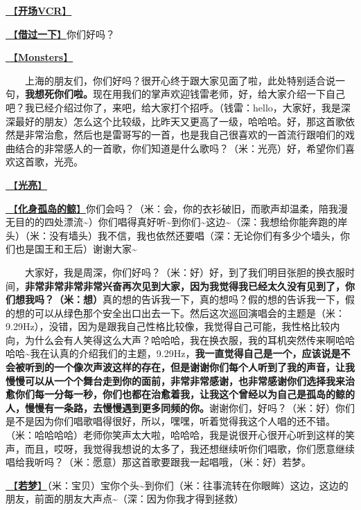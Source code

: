 \documentclass[]{ctexbook}
\begin{document}
\hyperref[opening-vcr]{🎥【\textbf{开场VCR}】}

\hyperref[I-will-go-my-way]{🎵【\textbf{借过一下}】}你们好吗？

\hyperref[Monsters]{🎵【\textbf{Monsters}】}

  上海的朋友们，你们好吗？很开心终于跟大家见面了啦，此处特别适合说一句，\textbf{我想死你们啦。}现在用我们的掌声欢迎钱雷老师，好，给大家介绍一下自己吧？我已经介绍过你了，来吧，给大家打个招呼。（钱雷：hello，大家好，我是深深最好的朋友）怎么这个比较级，比昨天又更高了一级，哈哈哈。好，那这首歌依然是非常治愈，然后也是雷哥写的一首，也是我自己很喜欢的一首流行跟咱们的戏曲结合的非常感人的一首歌，你们知道是什么歌吗？（米：光亮）好，希望你们喜欢这首歌，光亮。

\hyperref[silver-linings]{🎵【\textbf{光亮}】}

\hyperref[hua-shen-gu-dao-de-jing]{🎵【\textbf{化身孤岛的鲸}】}你们会吗？（米：会，你的衣衫破旧，而歌声却温柔，陪我漫无目的的四处漂流\textasciitilde）你们唱得真好听\textasciitilde 到你们\textasciitilde 这边\textasciitilde（深：我想给你能奔跑的岸头）（米：没有墙头）我不信，我也依然还要唱（深：无论你们有多少个墙头，你们也是国王和王后）谢谢大家\textasciitilde{}

  大家好，我是周深，你们好吗？（米：好）好，到了我们明目张胆的换衣服时间，\textbf{非常非常非常非常兴奋再次见到大家，因为我觉得我已经太久没有见到了，你们想我吗？（米：想）}真的想的告诉我一下，真的想吗？假的想的告诉我一下，假的想的可以从绿色那个安全出口出去一下。然后这次巡回演唱会的主题是（米：9.29Hz），没错，因为是跟我自己性格比较像，我觉得自己可能，我性格比较内向，为什么会有人笑得这么大声？哈哈哈，我在换衣服，我的耳机突然传来啊哈哈哈哈\textasciitilde 我在认真的介绍我们的主题，9.29Hz，\textbf{我一直觉得自己是一个，应该说是不会被听到的一个像次声波这样的存在，但是谢谢你们每个人听到了我的声音，让我慢慢可以从一个个舞台走到你的面前，非常非常感谢，也非常感谢你们选择我来治愈你们每一分每一秒，你们也都在治愈着我，让我这个曾经以为自己是孤岛的鲸的人，慢慢有一条路，去慢慢遇到更多同频的你。}谢谢你们，好吗？（米：好）你们是不是因为你们唱歌唱得很好，所以，嘿嘿，听着觉得我这个人唱的还不错。（米：哈哈哈哈）老师你笑声太大啦，哈哈哈，我是说很开心很开心听到这样的笑声，而且，哎呀，我觉得我想说的太多了，我还想继续听你们唱歌，你们愿意继续唱给我听吗？（米：愿意）那这首歌要跟我一起唱哦，（米：好）若梦。

\hyperref[ruomeng]{🎵【\textbf{若梦}】}（米：宝贝）宝你个头\textasciitilde 到你们（米：往事流转在你眼眸）这边，这边的朋友，前面的朋友大声点\textasciitilde（深：因为你我才得到拯救）
\end{document}

